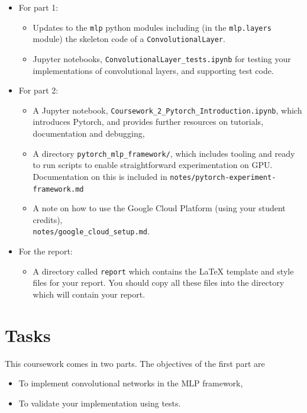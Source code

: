 \documentclass[11pt,]{article}
\begin{document}
\begin{itemize}
    \item For part 1:
    \begin{itemize}
        \item Updates to the \texttt{mlp} python modules including (in the \verb+mlp.layers+ module) the skeleton code of a \texttt{ConvolutionalLayer}.
        \item Jupyter notebooks, \texttt{ConvolutionalLayer\_tests.ipynb} for testing your implementations of convolutional layers, and supporting test code.
    \end{itemize}
    \newpage
     \item For part 2:
    \begin{itemize}
        \item A Jupyter notebook, \texttt{Coursework\_2\_Pytorch\_Introduction.ipynb}, which introduces Pytorch, and provides further resources on tutorials, documentation and debugging,
        \item A directory \texttt{pytorch\_mlp\_framework/}, which includes tooling and ready to run scripts to enable straightforward experimentation on GPU.  Documentation on this is included in  \texttt{notes/pytorch-experiment-framework.md}
        \item A note on how to use the Google Cloud Platform (using your student credits),\\\texttt{notes/google\_cloud\_setup.md}.
    \end{itemize}
     \item For the report:
    \begin{itemize}
        \item  A directory called  \texttt{report} which contains the LaTeX template and style files for your report.  You should copy all these files into the directory which will contain your report.
    \end{itemize}
\end{itemize}


\section{Tasks}
\label{sec:tasks}
This coursework comes in two parts. The objectives of the first part are
\begin{itemize} 
    \item To implement convolutional networks in the MLP framework,
    \item To validate your implementation using tests.
\end{itemize}
\end{document}
